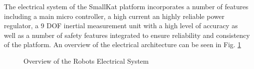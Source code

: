 \documentclass[12pt]{report}
\begin{document}
The electrical system of the SmallKat platform incorporates a number of features including a main micro controller, a high current an highly reliable power regulator, a 9 DOF inertial measurement unit with a high level of accuracy as well as a number of safety features integrated to ensure reliability and consistency of the platform. An overview of the electrical architecture can be seen in Fig. \ref{fig:elecpic}

\begin{figure}[H]
    \centering
    \caption{Overview of the Robots Electrical System}
    \label{fig:elecpic}
\end{figure}
\end{document}

